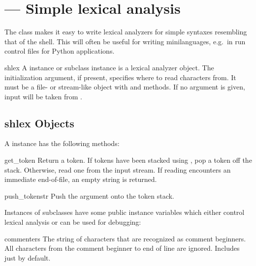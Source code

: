 
\section{ ---
         Simple lexical analysis}



The  class makes it easy to write lexical analyzers for
simple syntaxes resembling that of the \UNIX{} shell.  This will often
be useful for writing minilanguages, e.g.\ in run control files for
Python applications.

\begin{classdesc}{shlex}{}
A  instance or subclass instance is a lexical analyzer
object.  The initialization argument, if present, specifies where to
read characters from. It must be a file- or stream-like object with
 and  methods.  If no argument is given,
input will be taken from .

\end{classdesc}

\subsection{shlex Objects \label{shlex-objects}}

A  instance has the following methods:

\begin{methoddesc}{get_token}{}
Return a token.  If tokens have been stacked using
, pop a token off the stack.  Otherwise, read one
from the input stream.  If reading encounters an immediate
end-of-file, an empty string is returned. 
\end{methoddesc}

\begin{methoddesc}{push_token}{str}
Push the argument onto the token stack.
\end{methoddesc}

Instances of  subclasses have some public instance
variables which either control lexical analysis or can be used
for debugging:

\begin{memberdesc}{commenters}
The string of characters that are recognized as comment beginners.
All characters from the comment beginner to end of line are ignored.
Includes just \character{\#} by default.   
\end{memberdesc}

